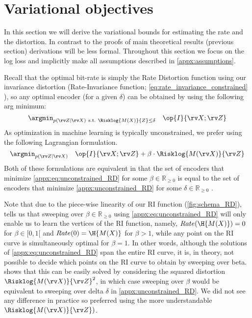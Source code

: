 \documentclass[final]{article}
\begin{document}
\clearpage
\newpage 
\section{Variational objectives}
\label{appx:objectives}


In this section we will derive the variational bounds for estimating the rate and the distortion.
In contrast to the proofs of main theoretical results (previous section) derivations  will be less formal.
Throughout this section we focus on the log loss and implicitly make all assumptions described in \cref{appx:assumptions}.

Recall that the optimal bit-rate is simply the Rate Distortion function using our invariance distortion (Rate-Invariance function; \cref{eq:rate_invariance_constrained} ), so any optimal encoder (for a given $\delta$) can be obtained by using the following arg minimum:
\begin{equation}\label{appx:unconstrained_RD}
 \argmin_{p(\rv Z| \rv X) \ \text{s.t.} \ \Risklog{M(X)}{Z} \leq \delta}  \quad  \op{I}{\rv X; \rv Z}
\end{equation}
As optimization in machine learning is typically unconstrained, we prefer using the following Lagrangian formulation.
\begin{equation}\label{appx:eq:unconstrained_RD}
\argmin_{p(\rv Z| \rv X)}  \quad  \op{I}{\rv X; \rv Z} + \beta \cdot \Risklog{M(\rv X)}{\rv Z}
\end{equation}
Both of these formulations are equivalent in that the set of encoders that minimize \cref{appx:eq:unconstrained_RD} for some $\beta \in \mathbb{R}_{\geq 0} $ is equal to the set of encoders that minimize \cref{appx:unconstrained_RD} for some $\delta \in \mathbb{R}_{\geq 0}$ \cite{everett_generalized_1963,berger_rate-distortion_2003}.

Note that due to the piece-wise linearity of our RI function (\cref{fig:schema_RD}), \citet{kolchinsky_caveats_2019} tells us that sweeping over $\beta \in \mathbb{R}_{\geq 0}$ using \cref{appx:eq:unconstrained_RD} will only enable us to learn the vertices of the RI function, namely, $Rate(\H{M(X)})=0$ for $\beta \in [0,1[$ and $Rate(0)=\H{M(X)}$ for $\beta > 1$,
while any point on the RI curve is simultaneously optimal for $\beta=1$.
In other words, although the solutions of \cref{appx:eq:unconstrained_RD} span the entire RI curve, it is, in theory, not possible to decide which points on the RI curve to obtain by sweeping over beta.
\citet{kolchinsky_caveats_2019} shows that this can be easily solved by considering the squared distortion $\Risklog{M(\rv X)}{\rv Z}^2$, in which case sweeping over $\beta$ would be equivalent to sweeping over delta $\delta$ in \cref{appx:unconstrained_RD}.
We did not see any difference in practice so preferred using the more understandable  $\Risklog{M(\rv X)}{\rv Z})$.
\end{document}
